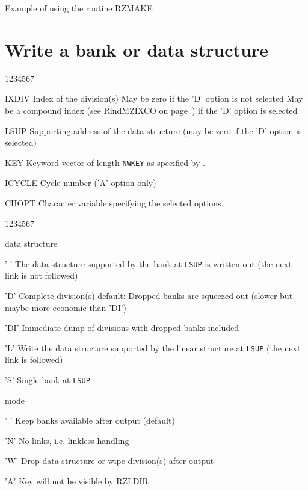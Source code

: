 \begin{XMPt}{Example of using the routine RZMAKE}
\section{Write a bank or data structure}
\Idesc
\begin{DLtt}{1234567}
\item[IXDIV]Index of the division(s)
\newline May be zero if the 'D' option is not selected
\newline May be a compound index
(see Rind{MZIXCO} on page~\pageref{SR_MZIXCO})
if the 'D' option is selected
\item[LSUP]Supporting address
of the data structure (may be zero if the 'D' option is selected)
\item[KEY]Keyword vector of length {\tt NWKEY} as specified by .
\item[ICYCLE]Cycle number ('A' option only)
\item[CHOPT]Character variable specifying the selected options.
\begin{DLtt}{1234567}
\item[data structure]
\begin{DLtt}{12}
\item[' ']The data structure supported by the bank at
{\tt LSUP} is written out (the next link is not followed)
\item['D']Complete division(s)
\newline default: Dropped banks are squeezed out
\newline\phantom{default: }(slower but maybe more economic than 'DI')
\item['DI']Immediate dump of divisions with dropped banks included
\item['L']Write the data structure supported by the linear structure
at {\tt LSUP}
(the next link is followed)
\item['S']Single bank at {\tt LSUP}
\end{DLtt}
\item[mode]
\begin{DLtt}{12}
\item[' ']Keep banks available after output (default)
\item['N']No links, i.e. linkless handling
\item['W']Drop data structure or wipe division(s) after output
\item['A']Key will not be visible by RZLDIR

\end{DLtt}
\end{DLtt}
\end{DLtt}
\end{XMPt}
